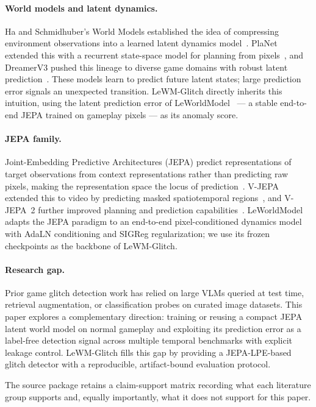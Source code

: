 \paragraph{World models and latent dynamics.}
Ha and Schmidhuber's World Models established the idea of compressing environment observations
into a learned latent dynamics model~\cite{worldmodels}. PlaNet extended this with a
recurrent state-space model for planning from pixels~\cite{planet}, and DreamerV3 pushed
this lineage to diverse game domains with robust latent prediction~\cite{dreamerv3}. These
models learn to predict future latent states; large prediction error signals an unexpected
transition. LeWM-Glitch directly inherits this intuition, using the latent prediction error
of LeWorldModel~\cite{lewm} --- a stable end-to-end JEPA trained on gameplay pixels --- as
its anomaly score.

\paragraph{JEPA family.}
Joint-Embedding Predictive Architectures (JEPA) predict representations of target observations
from context representations rather than predicting raw pixels, making the representation
space the locus of prediction~\cite{ijepa}. V-JEPA extended this to video by predicting
masked spatiotemporal regions~\cite{vjepa}, and V-JEPA~2 further improved planning and
prediction capabilities~\cite{vjepa2}. LeWorldModel~\cite{lewm} adapts the JEPA paradigm to
an end-to-end pixel-conditioned dynamics model with AdaLN conditioning and SIGReg
regularization; we use its frozen checkpoints as the backbone of LeWM-Glitch.

\paragraph{Research gap.}
Prior game glitch detection work has relied on large VLMs queried at test time, retrieval
augmentation, or classification probes on curated image datasets. This paper explores a
complementary direction: training or reusing a compact JEPA latent world model on normal
gameplay and exploiting its prediction error as a label-free detection signal across multiple
temporal benchmarks with explicit leakage control. LeWM-Glitch fills this gap by providing a
JEPA-LPE-based glitch detector with a reproducible, artifact-bound evaluation protocol.

The source package retains a claim-support matrix recording what each literature group supports
and, equally importantly, what it does not support for this paper.


